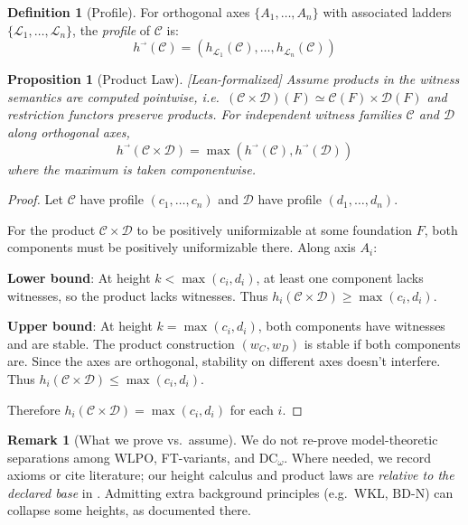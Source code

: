 \documentclass[11pt]{article}
\theoremstyle{plain}
\newtheorem{proposition}[theorem]{Proposition}
\theoremstyle{definition}
\newtheorem{definition}[theorem]{Definition}
\newtheorem{remark}[theorem]{Remark}
\newcommand{\WLPO}{\mathrm{WLPO}}
\newcommand{\DCw}{\mathrm{DC}_\omega}
\newcommand{\BDN}{\mathrm{BD\mbox{-}N}}
\newcommand{\WKL}{\mathrm{WKL}}
\newcommand{\leanok}{\textsf{\textcolor{green!70!black}{[Lean-formalized]}}}
\begin{document}
\begin{definition}[Profile]\label{def:profile}
For orthogonal axes $\{A_1, \ldots, A_n\}$ with associated ladders $\{\mathcal{L}_1, \ldots, \mathcal{L}_n\}$, the \emph{profile} of $\mathcal{C}$ is:
\[
h^{\vec{}}(\mathcal{C}) = (h_{\mathcal{L}_1}(\mathcal{C}), \ldots, h_{\mathcal{L}_n}(\mathcal{C}))
\]
\end{definition}

\begin{proposition}[Product Law]\label{prop:product} \leanok
Assume products in the witness semantics are computed pointwise, i.e.\ $(\mathcal C\times\mathcal D)(F)\simeq \mathcal C(F)\times \mathcal D(F)$ and restriction functors preserve products. For independent witness families $\mathcal{C}$ and $\mathcal{D}$ along orthogonal axes,
\[
h^{\vec{}}(\mathcal{C} \times \mathcal{D}) = \max(h^{\vec{}}(\mathcal{C}), h^{\vec{}}(\mathcal{D}))
\]
where the maximum is taken componentwise.
\end{proposition}

\begin{proof}
Let $\mathcal{C}$ have profile $(c_1, \ldots, c_n)$ and $\mathcal{D}$ have profile $(d_1, \ldots, d_n)$.

For the product $\mathcal{C} \times \mathcal{D}$ to be positively uniformizable at some foundation $F$, both components must be positively uniformizable there. Along axis $A_i$:

\textbf{Lower bound}: At height $k < \max(c_i, d_i)$, at least one component lacks witnesses, so the product lacks witnesses. Thus $h_i(\mathcal{C} \times \mathcal{D}) \geq \max(c_i, d_i)$.

\textbf{Upper bound}: At height $k = \max(c_i, d_i)$, both components have witnesses and are stable. The product construction $(w_C, w_D)$ is stable if both components are. Since the axes are orthogonal, stability on different axes doesn't interfere. Thus $h_i(\mathcal{C} \times \mathcal{D}) \leq \max(c_i, d_i)$.

Therefore $h_i(\mathcal{C} \times \mathcal{D}) = \max(c_i, d_i)$ for each $i$.
\end{proof}

\begin{remark}[What we prove vs.\ assume]\label{rem:orthog-disclaimer}
We do not re-prove model-theoretic separations among \(\WLPO\), FT-variants, and \(\DCw\). Where needed, we record axioms or cite literature; our height calculus and product laws are \emph{relative to the declared base} in . Admitting extra background principles (e.g.\ \(\WKL\), \(\BDN\)) can collapse some heights, as documented there.
\end{remark}
\end{document}
